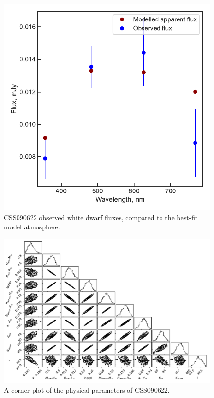 \begin{figure}
    \centering
    \includegraphics[width=\textwidth]{figures/results/CSS090622/fluxplot.pdf}
    \caption{CSS090622 observed white dwarf fluxes, compared to the best-fit model atmosphere.}
    \label{fig:CSS090622 flux plot}
\end{figure}
\begin{figure}
    \includegraphics[height=\textwidth, angle=90]{figures/results/physicalparams_corners/CSS090622_physcorner.pdf}
    \caption{A corner plot of the physical parameters of CSS090622.}
\end{figure}
\clearpage



